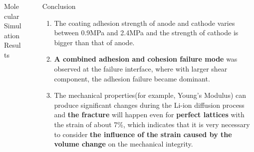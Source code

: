 \documentclass[final]{beamer}
\newlength{\sepwid}
\newlength{\onecolwid}
\newlength{\twocolwid}
\begin{document}
\begin{frame}[t]
\begin{columns}[t]
\begin{column}{\twocolwid}
\begin{columns}[t,totalwidth=\twocolwid]
\begin{column}{\onecolwid}
\begin{block}{Molecular Simulation Results}
\begin{figure}
\end{figure}

\end{block}


\end{column} %

\end{columns} %

\end{column} %

\begin{column}{\sepwid}\end{column} %

\begin{column}{\onecolwid} %


\begin{block}{Conclusion}
\begin{enumerate}
	\item The coating adhesion strength of anode and cathode varies between 0.9MPa and 2.4MPa and the strength of cathode is bigger than that of anode.
	\item \textbf{A combined adhesion and cohesion failure mode} was observed at the failure interface, where with larger shear component, the adhesion failure became dominant. 
	\item The mechanical properties(for example, Young's Modulus) can produce significant changes during the Li-ion diffusion process and \textbf{the fracture} will happen even for \textbf{perfect lattices} with the strain of about 7\%, which indicates that it is very necessary to consider \textbf{the influence of the strain caused by the volume change} on the mechanical integrity.
\end{enumerate}
\end{block}





\end{column}
\end{columns}
\end{frame}
\end{document}
